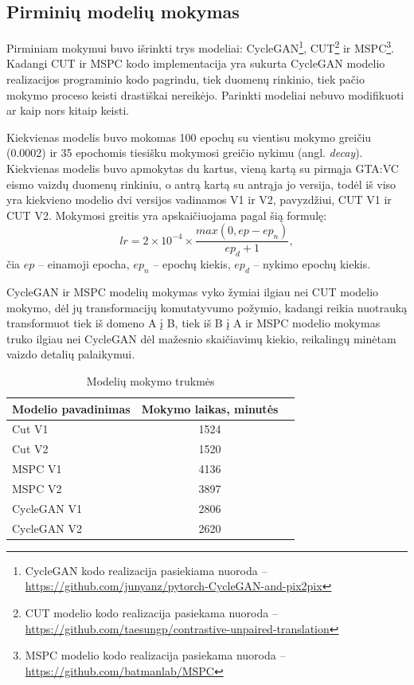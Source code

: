 \documentclass{VUMIFPSbakalaurinis}
\begin{document}
    \subsection{Pirminių modelių mokymas}
        Pirminiam mokymui buvo išrinkti trys modeliai: CycleGAN\footnote{CycleGAN kodo realizacija pasiekiama nuoroda – \href{https://github.com/junyanz/pytorch-CycleGAN-and-pix2pix}{https://github.com/junyanz/pytorch-CycleGAN-and-pix2pix}}, CUT\footnote{CUT modelio kodo realizacija pasiekama nuoroda – \href{https://github.com/taesungp/contrastive-unpaired-translation}{https://github.com/taesungp/contrastive-unpaired-translation}} ir MSPC\footnote{MSPC modelio kodo realizacija pasiekama nuoroda – \href{https://github.com/batmanlab/MSPC}{https://github.com/batmanlab/MSPC}}. Kadangi CUT ir MSPC kodo implementacija yra sukurta CycleGAN modelio realizacijos programinio kodo pagrindu, tiek duomenų rinkinio, tiek pačio mokymo proceso keisti drastiškai nereikėjo. Parinkti modeliai nebuvo modifikuoti ar kaip nors kitaip keisti.

        Kiekvienas modelis buvo mokomas 100 epochų su vientisu mokymo greičiu (0.0002) ir 35 epochomis tiesišku mokymosi greičio nykimu (angl. \emph{decay}).  Kiekvienas modelis buvo apmokytas du kartus, vieną kartą su pirmąja GTA:VC eismo vaizdų duomenų rinkiniu, o antrą kartą su antrąja jo versija, todėl iš viso yra kiekvieno modelio dvi versijos vadinamos V1 ir V2, pavyzdžiui, CUT V1 ir CUT V2. Mokymosi greitis yra apskaičiuojama pagal šią formulę:
        \[ lr = 2\times10^{-4} \times \frac{ max(0, ep - ep_n)}{ep_d + 1},\] čia $ep$ – einamoji epocha, $ep_{n}$ – epochų kiekis, $ep_{d}$ – nykimo epochų kiekis.

        CycleGAN ir MSPC modelių mokymas vyko žymiai ilgiau nei CUT modelio mokymo, dėl jų transformacijų komutatyvumo požymio, kadangi reikia nuotrauką transformuot tiek iš domeno A į B, tiek iš B į A ir MSPC modelio mokymas truko ilgiau nei CycleGAN dėl mažesnio skaičiavimų kiekio, reikalingų minėtam vaizdo detalių palaikymui.
        \begin{table}[H]\footnotesize
          \centering
          \caption{Modelių mokymo trukmės}
          {\begin{tabular}{|l|c|c|} \hline
            Modelio pavadinimas & Mokymo laikas, minutės\\
            \hline
            Cut V1 & 1524 \\
            Cut V2 & 1520 \\ 
            MSPC V1 & 4136 \\
            MSPC V2 & 3897 \\
            CycleGAN V1 & 2806 \\
            CycleGAN V2 & 2620 \\
            \hline
          \end{tabular}}
          \label{tab:table example}
        \end{table}
\end{document}
